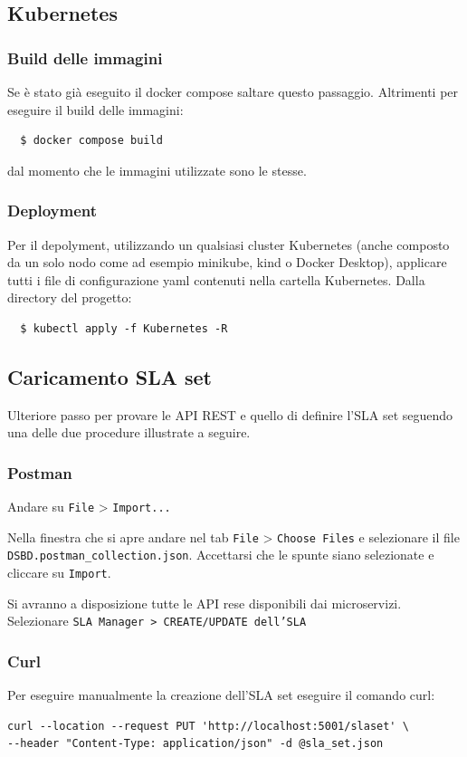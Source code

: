 \documentclass{article}
\begin{document}
\subsection{Kubernetes}
\subsubsection{Build delle immagini}
Se è stato già eseguito il docker compose saltare questo passaggio. Altrimenti per eseguire il build delle immagini:
\begin{verbatim}
  $ docker compose build
\end{verbatim}
dal momento che le immagini utilizzate sono le stesse.
\subsubsection{Deployment}
Per il depolyment, utilizzando un qualsiasi cluster Kubernetes (anche composto da un solo nodo come ad esempio minikube, kind o Docker Desktop), applicare tutti i file di configurazione yaml contenuti nella cartella Kubernetes. Dalla directory del progetto:
\begin{verbatim}
  $ kubectl apply -f Kubernetes -R
\end{verbatim}
\subsection{Caricamento SLA set}
Ulteriore passo per provare le API REST e quello di definire l'SLA set seguendo una delle due procedure illustrate a seguire.
\subsubsection{Postman}
Andare su \texttt{File} > \texttt{Import...}

Nella finestra che si apre andare nel tab \texttt{File} > \texttt{Choose Files} e selezionare il file \texttt{DSBD.postman\_collection.json}. Accettarsi che  le spunte siano selezionate e cliccare su \texttt{Import}.

Si avranno a disposizione tutte le API rese disponibili dai microservizi. Selezionare \texttt{SLA Manager > CREATE/UPDATE dell'SLA}
\subsubsection{Curl}
Per eseguire manualmente la creazione dell'SLA set eseguire il comando curl:
\begin{verbatim}
curl --location --request PUT 'http://localhost:5001/slaset' \
--header "Content-Type: application/json" -d @sla_set.json 
\end{verbatim}
\newpage
\appendix
\end{document}

